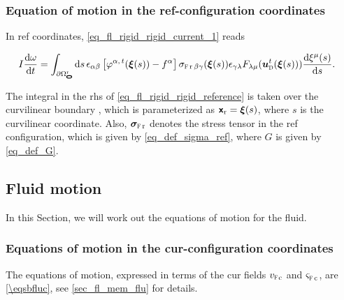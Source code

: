 \subsubsection{Equation of motion in the \acl{ref}-configuration coordinates}\label{sec_rigid_body_body_reference}

In  \ac{ref} coordinates, \cref{eq_fl_rigid_rigid_current_1} reads

\bw
\begin{align}
        \label{eq_fl_rigid_rigid_reference}
        I \der{\omega}{t} & = \int_\pomellipseeqr \dint{s} \, \epsilon_{\alpha \beta} \left[ \varphi^{\alpha, \, t}(\bxi{s}) - \focalpoint^\alpha \right] \sigmastressr{\beta}{\gamma}(\bxi{s}) \epsilon_{\gamma \lambda} F_{\lambda \mu}(\budom^t(\bxi{s})) \der{\xi^\mu(s)}{s}.
\end{align}
\ew

The integral in the \ac{rhs} of  \cref{eq_fl_rigid_rigid_reference} is taken over the curvilinear boundary \pomellipser, which is parameterized as ${\bm{{\mathsf{x}}}_{\textrm{r}}} = {\bm \xi}(s)$, where $s$ is the curvilinear coordinate. Also, $\bsigmastressr$ denotes the stress tensor in the \ac{ref} configuration, which is given by \cref{eq_def_sigma_ref}, where $G$ is given by \cref{eq_def_G}.


\subsection{Fluid motion}\label{sec_rigid_body_fl}

In this Section, we will work out the equations of motion for the fluid.

\subsubsection{Equations of motion in the \acl{cur}-configuration coordinates}\label{sec_rigid_body_fl_cur}



The equations of motion, expressed in terms of the \ac{cur} fields $\vfc$ and $\sigmafc{}$, are \cref{\eqsbfluc}, see \cref{sec_fl_mem_flu} for details.




